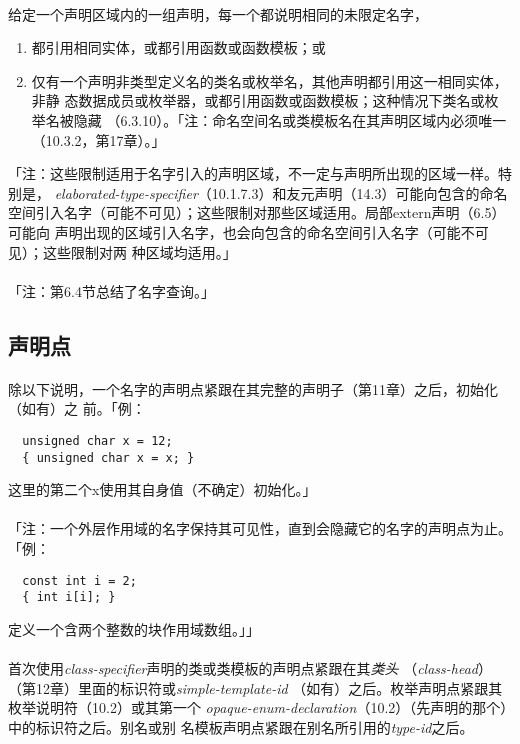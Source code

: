 \paragraph{}
给定一个声明区域内的一组声明，每一个都说明相同的未限定名字，
\begin{enumerate}
  \item{都引用相同实体，或都引用函数或函数模板；或}
  \item{仅有一个声明非类型定义名的类名或枚举名，其他声明都引用这一相同实体，非静
    态数据成员或枚举器，或都引用函数或函数模板；这种情况下类名或枚举名被隐藏
  （6.3.10）。「注：命名空间名或类模板名在其声明区域内必须唯一
  （10.3.2，第17章）。」}
\end{enumerate}
「注：这些限制适用于名字引入的声明区域，不一定与声明所出现的区域一样。特别是，
\textit{elaborated-type-specifier}（10.1.7.3）和友元声明（14.3）可能向包含的命名
空间引入名字（可能不可见）；这些限制对那些区域适用。局部extern声明（6.5）可能向
声明出现的区域引入名字，也会向包含的命名空间引入名字（可能不可见）；这些限制对两
种区域均适用。」

\paragraph{}
「注：第6.4节总结了名字查询。」

\subsection{声明点}

\paragraph{}
除以下说明，一个名字的声明点紧跟在其完整的声明子（第11章）之后，初始化（如有）之
前。「例：
\begin{lstlisting}
  unsigned char x = 12;
  { unsigned char x = x; }
\end{lstlisting}
这里的第二个x使用其自身值（不确定）初始化。」

\paragraph{}
「注：一个外层作用域的名字保持其可见性，直到会隐藏它的名字的声明点为止。
「例：
\begin{lstlisting}
  const int i = 2;
  { int i[i]; }
\end{lstlisting}
定义一个含两个整数的块作用域数组。」」


\paragraph{}
首次使用\textit{class-specifier}声明的类或类模板的声明点紧跟在其\textit{类头}
（\textit{class-head}）（第12章）里面的标识符或\textit{simple-template-id}
（如有）之后。枚举声明点紧跟其枚举说明符（10.2）或其第一个
\textit{opaque-enum-declaration}（10.2）（先声明的那个）中的标识符之后。别名或别
名模板声明点紧跟在别名所引用的\textit{type-id}之后。

